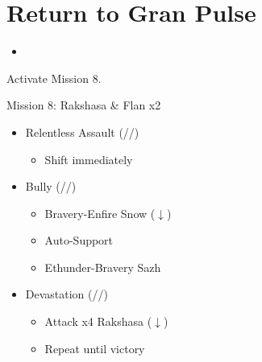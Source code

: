 \chapter{Return to Gran Pulse}

\begin{menu}
	\begin{itemize}
		\paradigm
		\begin{itemize}
			\item {}%
				{\paradigmline{\com}{\com}{\com}}%
				{\paradigmline{\com}{(\sab)}{\com}}%
				{\paradigmline[4]{\com}{\rav}{\rav}}%
				{\paradigmline{\syn}{\sab}{\com}}%
				{\paradigmline{\rav}{\med}{\rav}}%
				{\paradigmline{\rav}{\rav}{\rav}}%
		\end{itemize}
	\end{itemize}
\end{menu}

\renewcommand{\first}{[1] Cerberus (\com/\com/\com)}
\renewcommand{\second}{[2] Devastation (\com/\sab/\com)}
\renewcommand{\third}{[3] Relentless Assault (\com/\rav/\rav)}
\renewcommand{\fourth}{[4] Bully (\syn/\sab/\com)}
\renewcommand{\fifth}{[5] Thaumaturgy (\rav/\med/\rav)}
\renewcommand{\sixth}{[6] Tri-Disaster (\rav/\rav/\rav)}

Activate Mission 8.

\begin{battle}{Mission 8: Rakshasa \& Flan x2}
	\begin{itemize}
		\item \third
			\begin{itemize}
				\item Shift immediately
			\end{itemize}
		\item \fourth
			\begin{itemize}
				\item Bravery-Enfire Snow ($\downarrow$)
				\item Auto-Support
				\item Ethunder-Bravery Sazh
			\end{itemize}
		\item \second
			\begin{itemize}
				\item Attack x4 Rakshasa ($\downarrow$)
				\item Repeat until victory
			\end{itemize}
	\end{itemize}
\end{battle}

